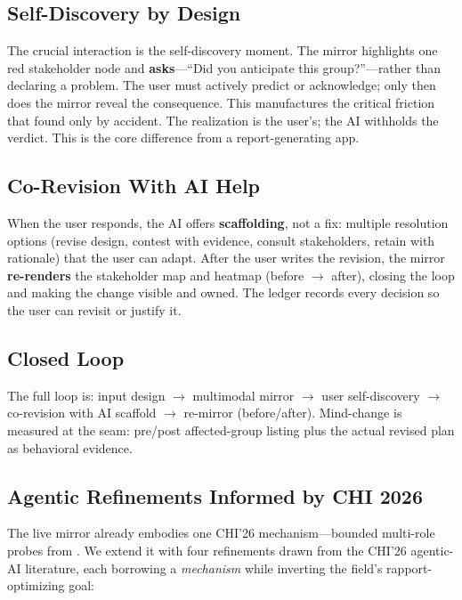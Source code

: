 \documentclass[sigconf,screen]{acmart}
\begin{document}
\subsection{Self-Discovery by Design}
The crucial interaction is the self-discovery moment. The mirror highlights one
red stakeholder node and \textbf{asks}---``Did you anticipate this group?''---rather
than declaring a problem. The user must actively predict or acknowledge; only
then does the mirror reveal the consequence. This manufactures the critical
friction that \citeauthor{taheri26} found only by accident. The realization is
the user's; the AI withholds the verdict. This is the core difference from a
report-generating app.

\subsection{Co-Revision With AI Help}
When the user responds, the AI offers \textbf{scaffolding}, not a fix: multiple
resolution options (revise design, contest with evidence, consult stakeholders,
retain with rationale) that the user can adapt. After the user writes the
revision, the mirror \textbf{re-renders} the stakeholder map and heatmap
(before $\rightarrow$ after), closing the loop and making the change visible and
owned. The ledger records every decision so the user can revisit or justify it.

\subsection{Closed Loop}
The full loop is: input design $\rightarrow$ multimodal mirror $\rightarrow$ user
self-discovery $\rightarrow$ co-revision with AI scaffold $\rightarrow$ re-mirror
(before/after). Mind-change is measured at the seam: pre/post affected-group
listing plus the actual revised plan as behavioral evidence.

\subsection{Agentic Refinements Informed by CHI 2026}
The live mirror already embodies one CHI'26 mechanism---bounded multi-role
probes from \citeauthor{perspectra26}. We extend it with four refinements drawn
from the CHI'26 agentic-AI literature, each borrowing a \emph{mechanism} while
inverting the field's rapport-optimizing goal:
\end{document}
